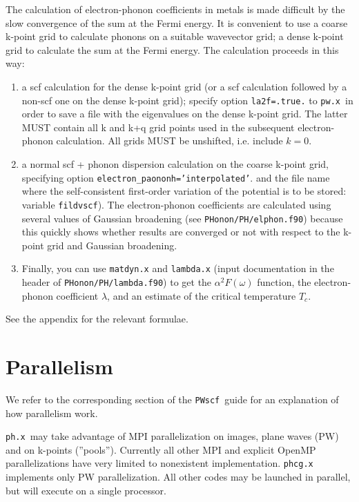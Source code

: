 \documentclass[12pt,a4paper]{article}
\def\pwx{\texttt{pw.x}}
\def\phx{\texttt{ph.x}}
\def\PWscf{\texttt{PWscf}}
\begin{document}
The calculation of electron-phonon coefficients in metals is made difficult 
by the slow convergence of the sum at the Fermi energy. It is convenient to 
use a coarse k-point grid to calculate phonons on a suitable wavevector grid;
a dense k-point grid to calculate the sum at the Fermi energy. The calculation
proceeds in this way:
\begin{enumerate}
\item a scf calculation for the dense k-point grid (or a scf calculation 
followed by a non-scf one on the dense k-point grid); specify 
option \texttt{la2f=.true.} to \pwx\ in order to save a file with 
the eigenvalues on the dense k-point grid. The latter MUST contain 
all k and k+q grid points used in the subsequent electron-phonon 
calculation. All grids MUST be unshifted, i.e. include $k=0$.
\item a normal scf + phonon dispersion calculation on the coarse k-point
grid, specifying option \texttt{electron\_paononh='interpolated'}. and 
the file name where
the self-consistent first-order variation of the potential is to be 
stored: variable \texttt{fildvscf}).
The electron-phonon coefficients are calculated using several
values of Gaussian broadening (see \texttt{PHonon/PH/elphon.f90}) because this quickly
shows whether results are converged or not with respect to the k-point grid
and Gaussian broadening.
\item Finally, you can use \texttt{matdyn.x} and \texttt{lambda.x} 
(input documentation in the header of \texttt{PHonon/PH/lambda.f90})
to get the $\alpha^2F(\omega)$ function, the electron-phonon coefficient
$\lambda$, and an estimate of the critical temperature $T_c$.
\end{enumerate}
See the appendix for the relevant formulae.

\section{Parallelism}
\label{Sec:para}

We refer to the corresponding section of the \PWscf\ guide for
an explanation of how parallelism work. 

\phx\ may take advantage of MPI parallelization on images, plane waves (PW) 
and on k-points (''pools''). Currently all other MPI and explicit OpenMP 
parallelizations have very limited to nonexistent implementation.
\texttt{phcg.x} implements only PW parallelization.
All other codes may be launched in parallel, but will execute 
on a single processor.
\end{document}
